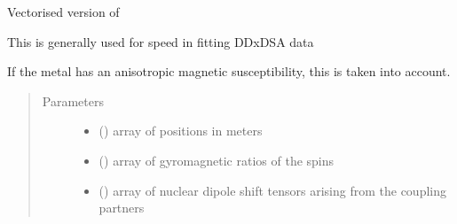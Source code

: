 \documentclass[a4paper,10pt,english,openany,oneside]{sphinxmanual}
\begin{document}
\begin{fulllineitems}
\begin{fulllineitems}
\begin{fulllineitems}
\label{\detokenize{reference/generated/paramagpy.metal.Metal.fast_ccr:paramagpy.metal.Metal.fast_ccr}}
Vectorised version of {\hyperref[\detokenize{reference/generated/paramagpy.metal.Metal.ccr:paramagpy.metal.Metal.ccr}]{}}

This is generally used for speed in fitting DDxDSA data

If the metal has an anisotropic magnetic susceptibility, this is
taken into account.
\begin{quote}\begin{description}
\item[{Parameters}] \leavevmode\begin{itemize}
\item {} 
 (\sphinxstyleliteralemphasis{\sphinxupquote{ (}}\sphinxstyleliteralemphasis{\sphinxupquote{,}}\sphinxstyleliteralemphasis{\sphinxupquote{)}}) \textendash{} array of positions in meters

\item {} 
 (\sphinxstyleliteralemphasis{\sphinxupquote{ (}}\sphinxstyleliteralemphasis{\sphinxupquote{,}}\sphinxstyleliteralemphasis{\sphinxupquote{)}}) \textendash{} array of gyromagnetic ratios of the spins

\item {} 
 (\sphinxstyleliteralemphasis{\sphinxupquote{ (}}\sphinxstyleliteralemphasis{\sphinxupquote{,}}\sphinxstyleliteralemphasis{\sphinxupquote{,}}\sphinxstyleliteralemphasis{\sphinxupquote{)}}) \textendash{} array of nuclear dipole shift tensors arising from
the coupling partners

\end{itemize}


\end{description}
\end{quote}
\end{fulllineitems}
\end{fulllineitems}
\end{fulllineitems}
\end{document}
